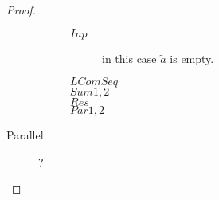 \begin{proposition}
\begin{proof}
\begin{description}
\begin{description}
	    \begin{description}	
	      \item[$Inp$] 
		in this case $\tilde{a}$ is empty.
	      \item[$LComSeq$]
	      \item[$Sum1,2$]
	      \item[$Res$]
	      \item[$Par1,2$]
	    \end{description}
	\end{description}
      \item[Parallel] ?
    \end{description}
  \end{proof}
\end{proposition}


% 

